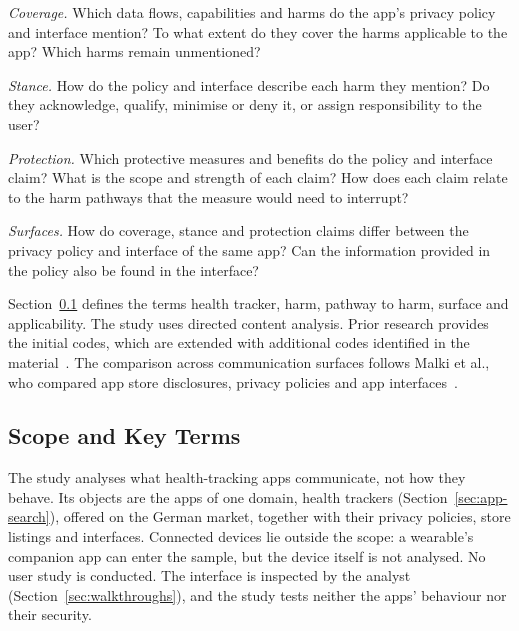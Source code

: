 \begin{description}[leftmargin=1.5em,itemsep=1pt,topsep=3pt,
	labelindent=0pt,font=\normalfont\bfseries]
	\item[RQ1] \textit{Coverage.} Which data flows, capabilities and harms do
	the app's privacy policy and interface mention? To what extent do they
	cover the harms applicable to the app? Which harms remain unmentioned?
	
	\item[RQ2] \textit{Stance.} How do the policy and interface describe each
	harm they mention? Do they acknowledge, qualify, minimise or deny it,
	or assign responsibility to the user?
	
	\item[RQ3] \textit{Protection.} Which protective measures and benefits
	do the policy and interface claim? What is the scope and strength of
	each claim? How does each claim relate to the harm pathways that the
	measure would need to interrupt?
	
	\item[RQ4] \textit{Surfaces.} How do coverage, stance and protection
	claims differ between the privacy policy and interface of the same app?
	Can the information provided in the policy also be found in the interface?
\end{description}

Section~\ref{sec:scope} defines the terms health tracker, harm, pathway to
harm, surface and applicability. The study uses directed content analysis. Prior research provides the
initial codes, which are extended with additional codes identified in the
material~\parencite{hsieh2005three,krippendorff2019content}.
The comparison across communication surfaces follows Malki et al., who
compared app store disclosures, privacy policies and app
interfaces~\parencite{malki2024exploring}.

\subsection{Scope and Key Terms}
\label{sec:scope}
The study analyses what health-tracking apps communicate, not how they behave. Its objects
are the apps of one domain, health trackers (Section~\ref{sec:app-search}), offered on the
German market, together with their privacy policies, store listings and interfaces.
Connected devices lie outside the scope: a wearable's companion app can enter the sample, but
the device itself is not analysed. No user study is conducted. The interface is inspected by
the analyst (Section~\ref{sec:walkthroughs}), and the study tests neither the apps' behaviour
nor their security.


